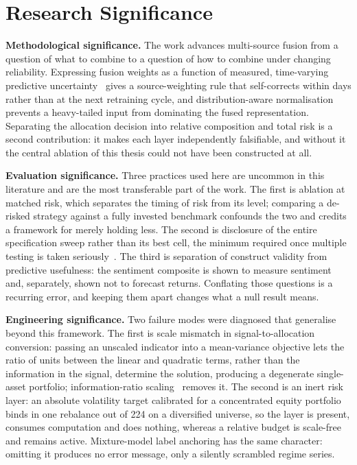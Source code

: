 \section{Research Significance}

\textbf{Methodological significance.} The work advances multi-source fusion from a
question of what to combine to a question of how to combine under changing reliability.
Expressing fusion weights as a function of measured, time-varying predictive
uncertainty~\cite{farimani2024} gives a source-weighting rule that self-corrects within
days rather than at the next retraining cycle, and distribution-aware normalisation
prevents a heavy-tailed input from dominating the fused representation. Separating the
allocation decision into relative composition and total risk is a second contribution: it
makes each layer independently falsifiable, and without it the central ablation of this
thesis could not have been constructed at all.

\textbf{Evaluation significance.} Three practices used here are uncommon in this
literature and are the most transferable part of the work. The first is ablation at
matched risk, which separates the timing of risk from its level; comparing a de-risked
strategy against a fully invested benchmark confounds the two and credits a framework for
merely holding less. The second is disclosure of the entire specification sweep rather
than its best cell, the minimum required once multiple testing is taken
seriously~\cite{harvey2015,valls2026}. The third is separation of construct validity from
predictive usefulness: the sentiment composite is shown to measure sentiment and,
separately, shown not to forecast returns. Conflating those questions is a recurring
error, and keeping them apart changes what a null result means.

\textbf{Engineering significance.} Two failure modes were diagnosed that generalise beyond
this framework. The first is scale mismatch in signal-to-allocation conversion: passing an
unscaled indicator into a mean-variance objective lets the ratio of units between the
linear and quadratic terms, rather than the information in the signal, determine the
solution, producing a degenerate single-asset portfolio; information-ratio
scaling~\cite{grinold2000} removes it. The second is an inert risk layer: an absolute
volatility target calibrated for a concentrated equity portfolio binds in one rebalance
out of 224 on a diversified universe, so the layer is present, consumes computation and
does nothing, whereas a relative budget is scale-free and remains active. Mixture-model
label anchoring has the same character: omitting it produces no error message, only a
silently scrambled regime series.


